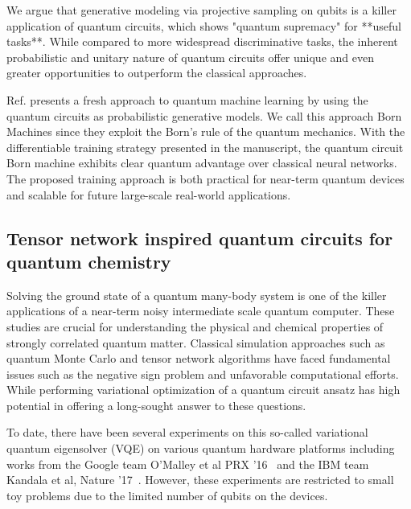 \documentclass[aps,longbibliography,english,superscriptaddress]{revtex4-1}
\begin{document}
We argue that generative modeling via projective sampling on qubits is a killer application of quantum circuits, which shows "quantum supremacy" for **useful tasks**. While compared to more widespread discriminative tasks, the inherent probabilistic and unitary nature of quantum circuits offer unique and even greater opportunities to outperform the classical approaches. 

Ref.\cite{Liu2018} presents a fresh approach to quantum machine learning by using the quantum circuits as probabilistic generative models. We call this approach Born Machines since they exploit the Born's rule of the quantum mechanics.
With the differentiable training strategy presented in the manuscript, the quantum circuit Born machine exhibits clear quantum advantage over classical neural networks. The proposed training approach is both practical for near-term quantum devices and scalable for future large-scale real-world applications.


\subsection{Tensor network inspired quantum circuits for quantum chemistry}
Solving the ground state of a quantum many-body system is one of the killer applications of a  near-term noisy intermediate scale quantum computer. These studies are crucial for understanding the physical and chemical properties of strongly correlated quantum matter. Classical simulation approaches such as quantum Monte Carlo and tensor network algorithms have faced fundamental issues such as the negative sign problem and unfavorable computational efforts. While performing variational optimization of a quantum circuit ansatz has high potential in offering a long-sought answer to these questions.   

To date, there have been several experiments on this so-called variational quantum eigensolver (VQE) on various quantum hardware platforms including works from the Google team O'Malley et al PRX '16~\cite{OMalley2016}  and the IBM team Kandala  et al, Nature '17~\cite{Kandala2017}.  However, these experiments are restricted to small toy problems due to the limited number of qubits on the devices.  
\end{document}

